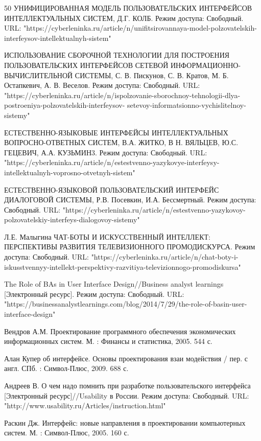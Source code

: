 \documentclass{article}
\begin{document}
\begin{thebibliography} {50}
УНИФИЦИРОВАННАЯ МОДЕЛЬ ПОЛЬЗОВАТЕЛЬСКИХ ИНТЕРФЕЙСОВ ИНТЕЛЛЕКТУАЛЬНЫХ СИСТЕМ, Д.Г. КОЛБ. Режим доступа: Свободный. URL: "https://cyberleninka.ru/article/n/unifitsirovannaya-model-polzovatelskih-interfeysov-intellektualnyh-sistem"

 ИСПОЛЬЗОВАНИЕ СБОРОЧНОЙ ТЕХНОЛОГИИ ДЛЯ ПОСТРОЕНИЯ ПОЛЬЗОВАТЕЛЬСКИХ ИНТЕРФЕЙСОВ СЕТЕВОЙ ИНФОРМАЦИОННО-ВЫЧИСЛИТЕЛЬНОЙ СИСТЕМЫ, С. В. Пискунов, С. В. Кратов, М. Б. Остапкевич, А. В. Веселов. Режим доступа: Свободный. URL: "https://cyberleninka.ru/article/n/ispolzovanie-sborochnoy-tehnologii-dlya-postroeniya-polzovatelskih-interfeysov-
setevoy-informatsionno-vychislitelnoy-sistemy"

ЕСТЕСТВЕННО-ЯЗЫКОВЫЕ ИНТЕРФЕЙСЫ ИНТЕЛЛЕКТУАЛЬНЫХ ВОПРОСНО-ОТВЕТНЫХ СИСТЕМ, В.А. ЖИТКО, В Н. ВЯЛЬЦЕВ, Ю.С. ГЕЦЕВИЧ, А.А. КУЗЬМИН3. Режим доступа: Свободный. URL:  "https://cyberleninka.ru/article/n/estestvenno-yazykovye-interfeysy-intellektualnyh-voprosno-otvetnyh-sistem"

ЕСТЕСТВЕННО-ЯЗЫКОВОЙ ПОЛЬЗОВАТЕЛЬСКИЙ ИНТЕРФЕЙС ДИАЛОГОВОЙ СИСТЕМЫ, Р.В. Посевкин, И.А. Бессмертный. Режим доступа: Свободный. URL: "https://cyberleninka.ru/article/n/estestvenno-yazykovoy-polzovatelskiy-interfeys-dialogovoy-sistemy"

Л.Е. Малыгина ЧАТ-БОТЫ И ИСКУССТВЕННЫЙ ИНТЕЛЛЕКТ: ПЕРСПЕКТИВЫ РАЗВИТИЯ ТЕЛЕВИЗИОННОГО 
ПРОМОДИСКУРСА. Режим доступа: Свободный. URL: "https://cyberleninka.ru/article/n/chat-boty-i-iskusstvennyy-intellekt-perspektivy-razvitiya-televizionnogo-promodiskursa"

The Role of BAs in User Interface Design//Business analyst learnings [Электронный ресурс]. Режим доступа: Свободный. URL: "https://businessanalystlearnings.com/blog/2014/7/29/the-role-of-basin-user-interface-design"

Вендров А.М. Проектирование программного обеспечения экономических информационных систем. М. : Финансы и статистика, 2005. 544 с.

Алан Купер об интерфейсе. Основы проектирования взаи модействия / пер. с англ. СПб. : Символ-Плюс, 2009. 688 с.

Андреев В. О чем надо помнить при разработке пользовательского интерфейса [Электронный ресурс]//Usability в России. Режим доступа: Свободный. URL: "http://www.usability.ru/Articles/instruction.html"

Раскин Дж. Интерфейс: новые направления в проектировании компьютерных систем. М. : Символ-Плюс, 2005. 160 с.


\end{thebibliography}
\end{document}
